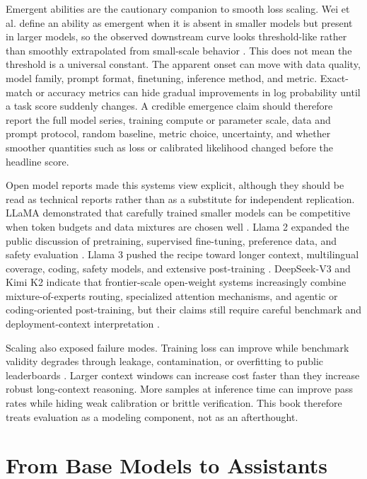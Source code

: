 Emergent abilities are the cautionary companion to smooth loss scaling. Wei et al. define an ability as emergent when it is absent in smaller models but present in larger models, so the observed downstream curve looks threshold-like rather than smoothly extrapolated from small-scale behavior \cite{wei2022emergent}. This does not mean the threshold is a universal constant. The apparent onset can move with data quality, model family, prompt format, finetuning, inference method, and metric. Exact-match or accuracy metrics can hide gradual improvements in log probability until a task score suddenly changes. A credible emergence claim should therefore report the full model series, training compute or parameter scale, data and prompt protocol, random baseline, metric choice, uncertainty, and whether smoother quantities such as loss or calibrated likelihood changed before the headline score.

Open model reports made this systems view explicit, although they should be read as technical reports rather than as a substitute for independent replication. LLaMA demonstrated that carefully trained smaller models can be competitive when token budgets and data mixtures are chosen well \cite{touvron2023llama}. Llama 2 expanded the public discussion of pretraining, supervised fine-tuning, preference data, and safety evaluation \cite{touvron2023llama2}. Llama 3 pushed the recipe toward longer context, multilingual coverage, coding, safety models, and extensive post-training \cite{dubey2024llama3}. DeepSeek-V3 and Kimi K2 indicate that frontier-scale open-weight systems increasingly combine mixture-of-experts routing, specialized attention mechanisms, and agentic or coding-oriented post-training, but their claims still require careful benchmark and deployment-context interpretation \cite{deepseek2024v3,kimi2025k2}.

Scaling also exposed failure modes. Training loss can improve while benchmark validity degrades through leakage, contamination, or overfitting to public leaderboards \cite{shi2023detecting,xu2024benchmark}. Larger context windows can increase cost faster than they increase robust long-context reasoning. More samples at inference time can improve pass rates while hiding weak calibration or brittle verification. This book therefore treats evaluation as a modeling component, not as an afterthought.

\section{From Base Models to Assistants}
\label{sec:base-to-assistants}


